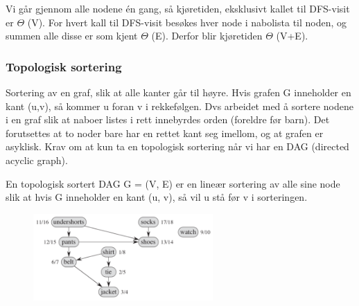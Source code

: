 \documentclass[12pt]{report}
\begin{document}
\par


\vspace{\baselineskip}
Vi går gjennom alle nodene én gang, så kjøretiden, eksklusivt kallet til DFS-visit er $ \Theta $ (V). For hvert kall til DFS-visit besøkes hver node i nabolista til noden, og summen alle disse er som kjent $ \Theta $ (E). Derfor blir kjøretiden $ \Theta $ (V+E). \par


\vspace{\baselineskip}\subsubsection*{Topologisk sortering}

\vspace{\baselineskip}
\setlength{\parskip}{0.0pt}
Sortering av en graf, slik at alle kanter går til høyre. Hvis grafen G inneholder en kant (u,v), så kommer u foran v i rekkefølgen. Dvs arbeidet med å sortere nodene i en graf slik at naboer listes i rett innebyrdes orden (foreldre før barn). Det forutsettes at to noder bare har en rettet kant seg imellom, og at grafen er asyklisk. Krav om at kun ta en topologisk sortering når vi har en DAG (directed acyclic graph).\par

En topologisk sortert DAG G = (V, E) er en lineær sortering av alle sine node slik at hvis G inneholder en kant (u, v), så vil u stå før v i sorteringen.\par




\begin{figure}[H]
\advance\leftskip 0.0in		\includegraphics[width=2.7in,height=1.3in]{./media/image102.png}
\end{figure}



\par
\end{document}
